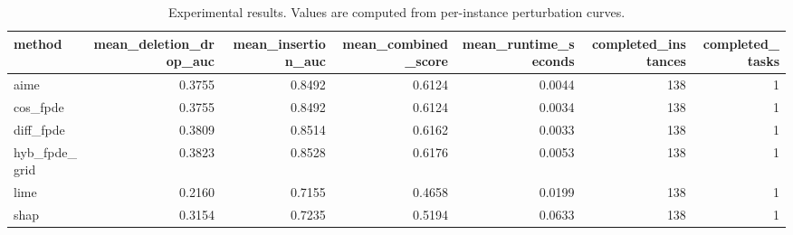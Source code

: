 \begin{table}[t]
\caption{Experimental results. Values are computed from per-instance perturbation curves.}
\label{tab:main_results_computed}
\centering
\begin{tabular}{lrrrrrr}
\toprule
method & mean\_deletion\_drop\_auc & mean\_insertion\_auc & mean\_combined\_score & mean\_runtime\_seconds & completed\_instances & completed\_tasks \\
\midrule
aime & 0.3755 & 0.8492 & 0.6124 & 0.0044 & 138 & 1 \\
cos\_fpde & 0.3755 & 0.8492 & 0.6124 & 0.0034 & 138 & 1 \\
diff\_fpde & 0.3809 & 0.8514 & 0.6162 & 0.0033 & 138 & 1 \\
hyb\_fpde\_grid & 0.3823 & 0.8528 & 0.6176 & 0.0053 & 138 & 1 \\
lime & 0.2160 & 0.7155 & 0.4658 & 0.0199 & 138 & 1 \\
shap & 0.3154 & 0.7235 & 0.5194 & 0.0633 & 138 & 1 \\
\bottomrule
\end{tabular}

\end{table}
